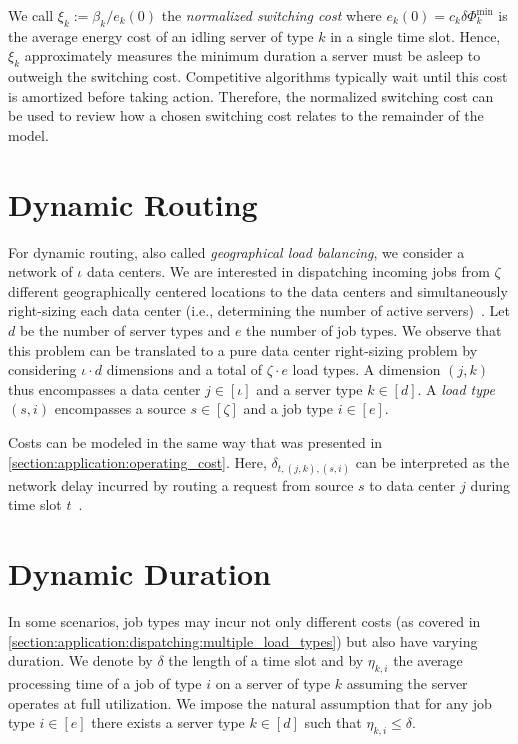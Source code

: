 We call $\xi_k := \beta_k / e_k(0)$ the \emph{normalized switching cost} where $e_k(0) = c_k \delta \Phi_k^{\text{min}}$ is the average energy cost of an idling server of type $k$ in a single time slot. Hence, $\xi_k$ approximately measures the minimum duration a server must be asleep to outweigh the switching cost. Competitive algorithms typically wait until this cost is amortized before taking action. Therefore, the normalized switching cost can be used to review how a chosen switching cost relates to the remainder of the model.

\section{Dynamic Routing}\label{section:application:dynamic_routing}

For dynamic routing, also called \emph{geographical load balancing}, we consider a network of $\iota$ data centers. We are interested in dispatching incoming jobs from $\zeta$ different geographically centered locations to the data centers and simultaneously right-sizing each data center (i.e., determining the number of active servers)~\cite{Lin2012}. Let $d$ be the number of server types and $e$ the number of job types. We observe that this problem can be translated to a pure data center right-sizing problem by considering $\iota \cdot d$ dimensions and a total of $\zeta \cdot e$ load types. A dimension $(j,k)$ thus encompasses a data center $j \in [\iota]$ and a server type $k \in [d]$. A \emph{load type} $(s,i)$ encompasses a source $s \in [\zeta]$ and a job type $i \in [e]$.

Costs can be modeled in the same way that was presented in \cref{section:application:operating_cost}. Here, $\delta_{t,(j,k),(s,i)}$ can be interpreted as the network delay incurred by routing a request from source $s$ to data center $j$ during time slot $t$~\cite{Lin2012}.

\section{Dynamic Duration}\label{section:application:dynamic_duration}

In some scenarios, job types may incur not only different costs (as covered in \cref{section:application:dispatching:multiple_load_types}) but also have varying duration. We denote by $\delta$ the length of a time slot and by $\eta_{k,i}$ the average processing time of a job of type $i$ on a server of type $k$ assuming the server operates at full utilization. We impose the natural assumption that for any job type $i \in [e]$ there exists a server type $k \in [d]$ such that $\eta_{k,i} \leq \delta$.


